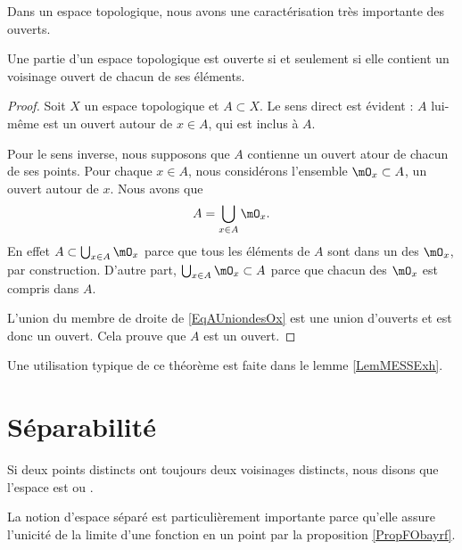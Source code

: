 Dans un espace topologique, nous avons une caractérisation très importante des ouverts.
\begin{theorem}		\label{ThoPartieOUvpartouv}
    Une partie d'un espace topologique est ouverte si et seulement si elle contient un voisinage ouvert de chacun de ses éléments.
\end{theorem}

\begin{proof} 
    Soit \( X\) un espace topologique et \( A\subset X\). Le sens direct est évident : $A$ lui-même est un ouvert autour de $x\in A$, qui est inclus à $A$.

Pour le sens inverse, nous supposons que \( A\) contienne un ouvert atour de chacun de ses points. Pour chaque $x\in A$, nous considérons l'ensemble $\mO_x\subset A$, un ouvert autour de $x$. Nous avons que
\begin{equation}	\label{EqAUniondesOx}
	A=\bigcup_{x\in A}\mO_x.
\end{equation}
En effet $A\subset\bigcup_{x\in A}\mO_x$ parce que tous les éléments de $A$ sont dans un des $\mO_x$, par construction. D'autre part, $\bigcup_{x\in A}\mO_x\subset A$ parce que chacun des $\mO_x$ est compris dans $A$.

L'union du membre de droite de \eqref{EqAUniondesOx} est une union d'ouverts et est donc un ouvert. Cela prouve que $A$ est un ouvert.

\end{proof}
Une utilisation typique de ce théorème est faite dans le lemme \ref{LemMESSExh}.

\section{Séparabilité}

\begin{definition}  \label{DefYFmfjjm}
    Si deux points distincts ont toujours deux voisinages distincts, nous disons que l'espace est  ou .
\end{definition}
La notion d'espace séparé est particulièrement importante parce qu'elle assure l'unicité de la limite d'une fonction en un point par la proposition \ref{PropFObayrf}.

